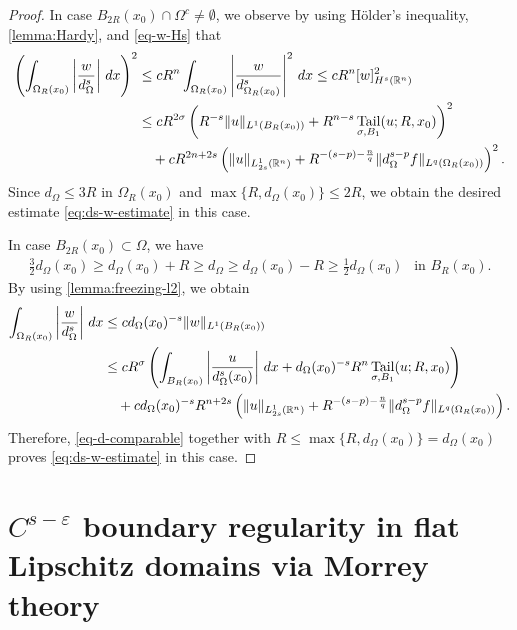 \documentclass[11pt,reqno]{amsart}
\theoremstyle{plain}
\theoremstyle{definition}
\numberwithin{equation}{section}
\newcommand{\R}{\mathbb{R}}
\newcommand{\eps}{\varepsilon}
\newcommand{\1}{\mathbbm{1}}
\DeclareMathOperator{\tail}{Tail}
\renewcommand{\d}{\textnormal{\,d}}
\begin{document}
\begin{proof}
In case $B_{2R}(x_0) \cap \Omega^c \not=\emptyset$, we observe by using H\"older's inequality, \autoref{lemma:Hardy}, and \eqref{eq-w-Hs} that
\begin{align*}
    \left( \int_{\Omega_R(x_0)} \left| \frac{w}{d_{\Omega}^s} \right| \d x \right)^2
    &\le cR^{n} \int_{\Omega_R(x_0)} \left| \frac{w}{d_{\Omega_R(x_0)}^s} \right|^2 \d x \le c R^n [w]_{H^s(\R^n)}^2 \\
    &\le c R^{2\sigma} \left( R^{-s}\|u\|_{L^1(B_R(x_0))} + R^{n-s} \tail_{\sigma,B_1}(u; R,x_0) \right)^2 \\
    &\quad + cR^{2n + 2s} \left( \Vert u \Vert_{L^1_{2s}(\R^n)} + R^{-(s-p) - \frac{n}{q}} \Vert d^{s-p}_{\Omega} f \Vert_{L^q(\Omega_{R}(x_0))} \right)^2.
\end{align*}
Since $d_\Omega \leq 3R$ in $\Omega_R(x_0)$ and $\max\{R,d_{\Omega}(x_0)\} \le 2R$, we obtain the desired estimate \eqref{eq:ds-w-estimate} in this case.

In case $B_{2R}(x_0) \subset \Omega$, we have
\begin{align}\label{eq-d-comparable}
\frac{3}{2} d_{\Omega}(x_0) \ge d_{\Omega}(x_0) + R \ge d_{\Omega} \ge d_{\Omega}(x_0) - R \ge \frac{1}{2} d_{\Omega}(x_0) ~~ \text{ in } B_{R}(x_0).
\end{align}
By using \autoref{lemma:freezing-l2}, we obtain
\begin{align*}
\int_{\Omega_R(x_0)} \left| \frac{w}{d_{\Omega}^s} \right| \d x &\le c d_{\Omega}(x_0)^{-s} \|w\|_{L^1(B_R(x_0))} \\
&\le c R^{\sigma} \left( \int_{B_R(x_0)} \left| \frac{u}{d_\Omega^s(x_0)} \right| \d x + d_{\Omega}(x_0)^{-s} R^{n} \tail_{\sigma,B_1}(u;R,x_0) \right) \\
&\quad + c d_{\Omega}(x_0)^{-s} R^{n + 2s} \left( \Vert u \Vert_{L^1_{2s}(\R^n)} + R^{-(s-p) - \frac{n}{q}} \Vert d_{\Omega}^{s-p} f \Vert_{L^q(\Omega_{R}(x_0))} \right).
\end{align*}
Therefore, \eqref{eq-d-comparable} together with $R \leq \max\{R, d_\Omega(x_0)\} = d_\Omega(x_0)$ proves \eqref{eq:ds-w-estimate} in this case.
\end{proof}


\section{\texorpdfstring{$C^{s-\eps}$}{Cs-e} boundary regularity in flat Lipschitz domains via Morrey theory}
\label{sec:Morrey}
\end{document}
